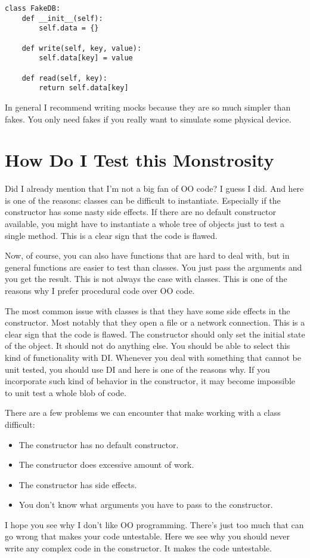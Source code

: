 \begin{programcode}{}
\begin{verbatim}
class FakeDB:
    def __init__(self):
        self.data = {}

    def write(self, key, value):
        self.data[key] = value

    def read(self, key):
        return self.data[key]
\end{verbatim}
\end{programcode}


In general I recommend writing mocks because they are so much simpler than fakes. You only need fakes if you really want to simulate some physical device.


\chapter{How Do I Test this Monstrosity}

Did I already mention that I'm not a big fan of OO code? I guess I did. And here is one of the reasons: classes can be difficult to instantiate. Especially if the constructor has some nasty side effects. If there are no default constructor available, you might have to instantiate a whole tree of objects just to test a single method. This is a clear sign that the code is flawed.

Now, of course, you can also have functions that are hard to deal with, but in general functions are easier to test than classes. You just pass the arguments and you get the result. This is not always the case with classes. This is one of the reasons why I prefer procedural code over OO code.

The most common issue with classes is that they have some side effects in the constructor. Most notably that they open a file or a network connection. This is a clear sign that the code is flawed. The constructor should only set the initial state of the object. It should not do anything else. You should be able to select this kind of functionality with DI. Whenever you deal with something that cannot be unit tested, you should use DI and here is one of the reasons why. If you incorporate such kind of behavior in the constructor, it may become impossible to unit test a whole blob of code.

There are a few problems we can encounter that make working with a class difficult:
\begin{itemize}
    \item The constructor has no default constructor.
    \item The constructor does excessive amount of work.
    \item The constructor has side effects.
    \item You don't know what arguments you have to pass to the constructor.
\end{itemize}
I hope you see why I don't like OO programming. There's just too much that can go wrong that makes your code untestable. Here we see why you should never write any complex code in the constructor. It makes the code untestable.

